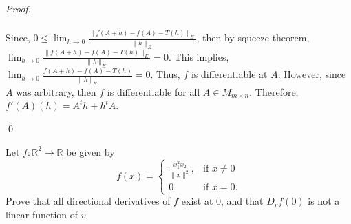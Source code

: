 \documentclass[12pt]{article}
\newenvironment{problem}[2][Problem]{\begin{trivlist}
\item[\hskip \labelsep {\bfseries #1}\hskip \labelsep {\bfseries #2.}]}{\end{trivlist}}
\newenvironment{sol}
    {\emph{Proof.}
    }
    {
    \qed
    }
\begin{document}
\begin{sol}
\begin{align*}
\end{align*}
Since, $0 \leq \lim_{h \to 0} \frac{\lVert f(A+h) - f(A) - T(h) \rVert_E}{\lVert h \rVert_E}$, then by squeeze theorem, $\lim_{h \to 0} \frac{\lVert f(A+h) - f(A) - T(h) \rVert_E}{\lVert h \rVert_E} = 0$. This implies, $\lim_{h \to 0} \frac{f(A+h) - f(A) - T(h)}{\lVert h \rVert_E} = 0$. Thus, $f$ is differentiable at $A$. However, since $A$ was arbitrary, then $f$ is differentiable for all $A \in M_{m \times n}$. Therefore, $f'(A)(h) = A^th + h^tA$.
\end{sol}

\begin{problem}{6} 
Let $f: \mathbb{R}^2 \to \mathbb{R}$ be given by $$f(x) = \begin{cases} 
     \frac{x_1^2 x_2}{\lVert x \rVert^2}, & \text{if } x \neq 0 \\
      0, & \text{if } x = 0. 
   \end{cases}
$$ Prove that all directional derivatives of $f$ exist at 0, and that $D_vf(0)$ is not a linear function of $v$.
\end{problem}
\end{document}
